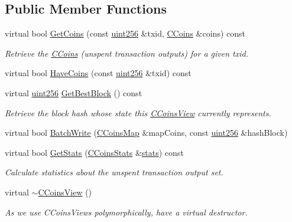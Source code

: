 \subsection*{Public Member Functions}
\begin{DoxyCompactItemize}
\item 
virtual bool \hyperlink{class_c_coins_view_aaf5668eb2f9033583d7072dc2a3f96ef}{Get\+Coins} (const \hyperlink{classuint256}{uint256} \&txid, \hyperlink{class_c_coins}{C\+Coins} \&coins) const 
\begin{DoxyCompactList}\small\item\em Retrieve the \hyperlink{class_c_coins}{C\+Coins} (unspent transaction outputs) for a given txid. \end{DoxyCompactList}\item 
virtual bool \hyperlink{class_c_coins_view_a14c8db07cb11223426bb660861389f3a}{Have\+Coins} (const \hyperlink{classuint256}{uint256} \&txid) const 
\item 
virtual \hyperlink{classuint256}{uint256} \hyperlink{class_c_coins_view_a556cf7661ff49df1ada5cd0ad552f8db}{Get\+Best\+Block} () const 
\begin{DoxyCompactList}\small\item\em Retrieve the block hash whose state this \hyperlink{class_c_coins_view}{C\+Coins\+View} currently represents. \end{DoxyCompactList}\item 
virtual bool \hyperlink{class_c_coins_view_ad7dc37396ca4fac7014cea06fec7178e}{Batch\+Write} (\hyperlink{coins_8h_a2886ba2fd0428bae777e1cbcabc02834}{C\+Coins\+Map} \&map\+Coins, const \hyperlink{classuint256}{uint256} \&hash\+Block)
\item 
virtual bool \hyperlink{class_c_coins_view_afd645b903fba9c6b84bdb898d764f5fc}{Get\+Stats} (\hyperlink{struct_c_coins_stats}{C\+Coins\+Stats} \&\hyperlink{db__bench_8cc_a5925d216740c89f43482df806fd14e8c}{stats}) const 
\begin{DoxyCompactList}\small\item\em Calculate statistics about the unspent transaction output set. \end{DoxyCompactList}\item 
virtual \hyperlink{class_c_coins_view_a7ffb4218bf991ddff47339e44c8710da}{$\sim$\+C\+Coins\+View} ()
\begin{DoxyCompactList}\small\item\em As we use C\+Coins\+Views polymorphically, have a virtual destructor. \end{DoxyCompactList}\end{DoxyCompactItemize}


